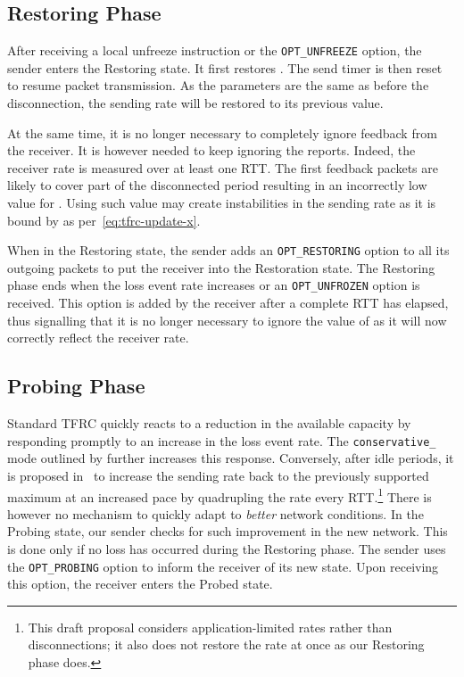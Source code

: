\documentclass[twocolumn]{nictatechreport}
\begin{document}
\subsection{Restoring Phase}

After receiving a local unfreeze instruction or the \verb#OPT_UNFREEZE# option,
the sender enters the Restoring state. It first restores .  The
send timer is then reset to resume packet transmission.  As the parameters are
the same as before the disconnection, the sending rate will be restored to its
previous value.

At the same time, it is no longer necessary to completely ignore feedback from
the receiver. It is however needed to keep ignoring the 
reports. Indeed, the receiver rate is measured over at least one RTT. The first
feedback packets are likely to cover part of the disconnected period resulting
in an incorrectly low value for . Using such value may create
instabilities in the sending rate as it is bound by  as
per~\eqref{eq:tfrc-update-x}.

When in the Restoring state, the sender adds an \verb#OPT_RESTORING# option to
all its outgoing packets to put the receiver into the Restoration state.  The
Restoring phase ends when the loss event rate increases or an
\verb#OPT_UNFROZEN# option is received. This option is added by the receiver
after a complete RTT has elapsed, thus signalling that it is no longer
necessary to ignore the value of  as it will now correctly
reflect the receiver rate.

\subsection{Probing Phase} 

Standard TFRC quickly reacts to a reduction in the available capacity by
responding promptly to an increase in the loss event rate. The
\verb!conservative_! mode outlined by
\cite{2001bansal_slowly_responsive_congestion_control} further increases this
response. Conversely, after idle periods, it is proposed
in~\cite{draft-ietf-dccp-tfrc-faster-restart-06} to increase the sending rate
back to the previously supported maximum at an increased pace by quadrupling the
rate every RTT.\footnote{This draft proposal considers application-limited rates
rather than disconnections; it also does not restore the rate at once as our
Restoring phase does.} There is however no mechanism to quickly adapt to
\emph{better} network conditions. In the Probing state, our sender checks for
such improvement in the new network. This is done only if no loss has occurred
during the Restoring phase. The sender uses the \verb#OPT_PROBING# option to
inform the receiver of its new state. Upon receiving this option, the receiver
enters the Probed state.
\end{document}
